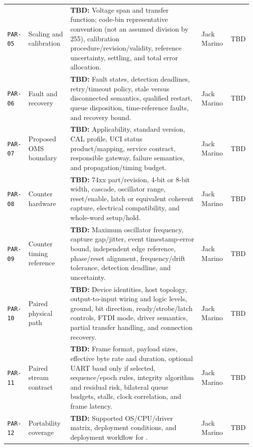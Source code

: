 \begin{landscape}
\begin{tabularx}{\linewidth}{L{2.0cm}L{3.5cm}Y L{2.2cm}L{2.2cm}}
\label{Parameter:PAR-05}\texttt{PAR-05} & Scaling and calibration & \textbf{TBD:} Voltage span and transfer function; code-bin representative convention (not an assumed division by 255), calibration procedure/revision/validity, reference uncertainty, settling, and total error allocation. & Jack Marino & TBD\\
\label{Parameter:PAR-06}\texttt{PAR-06} & Fault and recovery & \textbf{TBD:} Fault states, detection deadlines, retry/timeout policy, stale versus disconnected semantics, qualified restart, queue disposition, time-reference faults, and recovery bound. & Jack Marino & TBD\\
\label{Parameter:PAR-07}\texttt{PAR-07} & Proposed OMS boundary & \textbf{TBD:} Applicability, standard version, CAL profile, UCI status product/mapping, service contract, responsible gateway, failure semantics, and propagation/timing budget. & Jack Marino & TBD\\
\label{Parameter:PAR-08}\texttt{PAR-08} & Counter hardware & \textbf{TBD:} 74xx part/revision, 4-bit or 8-bit width, cascade, oscillator range, reset/enable, latch or equivalent coherent capture, electrical compatibility, and whole-word setup/hold. & Jack Marino & TBD\\
\label{Parameter:PAR-09}\texttt{PAR-09} & Counter timing reference & \textbf{TBD:} Maximum oscillator frequency, capture gap/jitter, event timestamp-error bound, independent edge reference, phase/reset alignment, frequency/drift tolerance, detection deadline, and uncertainty. & Jack Marino & TBD\\
\label{Parameter:PAR-10}\texttt{PAR-10} & Paired physical path & \textbf{TBD:} Device identities, host topology, output-to-input wiring and logic levels, ground, bit direction, ready/strobe/latch controls, FTDI mode, driver semantics, partial transfer handling, and connection recovery. & Jack Marino & TBD\\
\label{Parameter:PAR-11}\texttt{PAR-11} & Paired stream contract & \textbf{TBD:} Frame format, payload sizes, effective byte rate and duration, optional UART baud only if selected, sequence/epoch rules, integrity algorithm and residual risk, bilateral queue budgets, stalls, clock correlation, and frame latency. & Jack Marino & TBD\\
\label{Parameter:PAR-12}\texttt{PAR-12} & Portability coverage & \textbf{TBD:} Supported OS/CPU/driver matrix, deployment conditions, and deployment workflow for . & Jack Marino & TBD\\

\end{tabularx}
\end{landscape}
